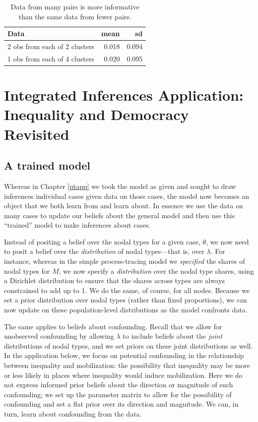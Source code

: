 \documentclass[
  12pt,
]{book}
\begin{document}
\begin{table}

\caption{\label{tab:cluster}Data from many pairs is more informative than the same data from fewer pairs.}
\centering
\begin{tabular}[t]{l|r|r}
\hline
Data & mean & sd\\
\hline
2 obs from each of 2 clusters & 0.018 & 0.094\\
\hline
1 obs from each of 4 clusters & 0.020 & 0.095\\
\hline
\end{tabular}
\end{table}

\hypertarget{mixingapp}{%
\chapter{Integrated Inferences Application: Inequality and Democracy Revisited}\label{mixingapp}}

\hypertarget{a-trained-model}{%
\section{A trained model}\label{a-trained-model}}

Whereas in Chapter \ref{ptapp} we took the model as given and sought to draw inferences individual cases given data on those cases, the model now becomes an object that we both learn from and learn about. In essence we use the data on many cases to update our beliefs about the general model and then use this ``trained'' model to make inferences about cases.

Instead of positing a belief over the nodal types for a given case, \(\theta\), we now need to posit a belief over the \emph{distribution} of nodal types---that is, over \(\lambda\). For instance, whereas in the simple process-tracing model we \emph{specified} the shares of nodal types for \(M\), we now specify a \emph{distribution} over the nodal type shares, using a Dirichlet distribution to ensure that the shares across types are always constrained to add up to 1. We do the same, of course, for all nodes. Because we set a prior distribution over nodal types (rather than fixed proportions), we can now update on these population-level distributions as the model confronts data.

The same applies to beliefs about confounding. Recall that we allow for unobserved confounding by allowing \(\lambda\) to include beliefs about the \emph{joint} distributions of nodal types, and we set priors on these joint distributions as well. In the application below, we focus on potential confounding in the relationship between inequality and mobilization: the possibility that inequality may be more or less likely in places where inequality would induce mobilization. Here we do not express informed prior beliefs about the direction or magnitude of such confounding; we set up the parameter matrix to allow for the possibility of confounding and set a flat prior over its direction and magnitude. We can, in turn, learn about confounding from the data.
\end{document}
